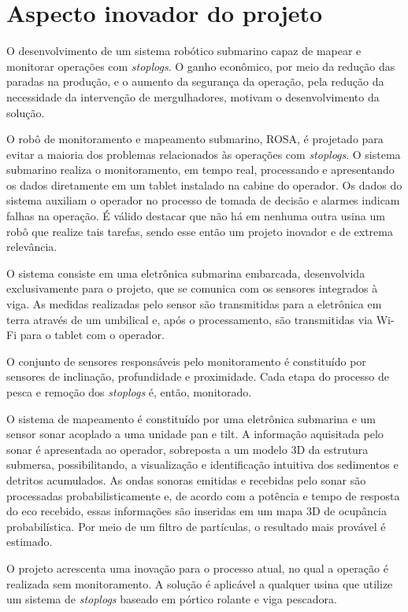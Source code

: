 \section{Aspecto inovador do projeto}

O desenvolvimento de um sistema robótico submarino capaz de mapear e monitorar
operações com \textit{stoplogs}. O ganho econômico, por meio da
redução das paradas na produção, e o aumento da segurança da operação,
pela redução da necessidade da intervenção de mergulhadores, motivam o
desenvolvimento da solução.

O robô de monitoramento e mapeamento submarino, ROSA, é projetado para evitar a
maioria dos problemas relacionados às operações com \textit{stoplogs}. O sistema
submarino realiza o monitoramento, em tempo real, processando e apresentando os
dados diretamente em um tablet instalado na cabine do operador. Os dados do
sistema auxiliam o operador no processo de tomada de decisão e alarmes indicam
falhas na operação. É válido destacar que não há em nenhuma outra usina um robô
que realize tais tarefas, sendo esse então um projeto inovador e de extrema
relevância. 

O sistema consiste em uma eletrônica submarina embarcada, desenvolvida
exclusivamente para o projeto, que se comunica com os sensores integrados à
viga. As medidas realizadas pelo sensor são transmitidas para a
eletrônica em terra através de um umbilical e, após o processamento, são
transmitidas via Wi-Fi para o tablet com o operador.

O conjunto de sensores responsáveis pelo monitoramento é constituído por
sensores de inclinação, profundidade e proximidade. Cada etapa do processo de
pesca e remoção dos \textit{stoplogs} é, então, monitorado.

O sistema de mapeamento é constituído por uma eletrônica submarina e um sensor
sonar acoplado a uma unidade pan e tilt. A informação aquisitada pelo sonar é
apresentada ao operador, sobreposta a um modelo 3D da estrutura submersa, possibilitando, a
visualização e identificação intuitiva dos sedimentos e detritos acumulados.
As ondas sonoras emitidas e recebidas pelo sonar são processadas 
probabilisticamente e, de acordo com a potência e tempo de resposta
do eco recebido, essas informações são inseridas em um mapa 3D de ocupância
probabilística. Por meio de um filtro de partículas, o resultado mais provável
é estimado.

O projeto acrescenta uma inovação para o processo atual, no qual a operação é
realizada sem monitoramento. A solução é aplicável a qualquer usina que utilize
um sistema de \textit{stoplogs} baseado em pórtico rolante e viga pescadora.


